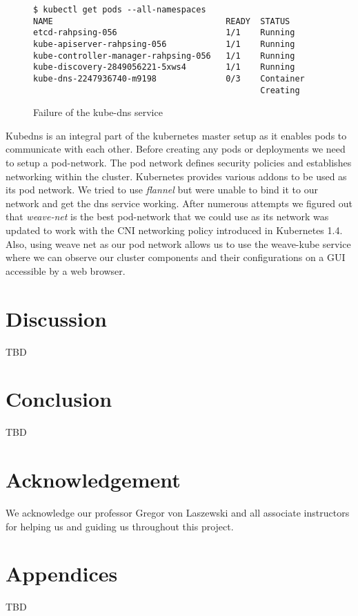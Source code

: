 \documentclass[9pt,twocolumn,twoside]{../../styles/osajnl}
\begin{document}
\begin{figure}[H]
\begin{verbatim}
$ kubectl get pods --all-namespaces
NAME                                   READY  STATUS       
etcd-rahpsing-056                      1/1    Running          
kube-apiserver-rahpsing-056            1/1    Running           
kube-controller-manager-rahpsing-056   1/1    Running           
kube-discovery-2849056221-5xws4        1/1    Running         
kube-dns-2247936740-m9198              0/3    Container
                                              Creating
\end{verbatim}
\vspace{-3mm}
\caption{Failure of the kube-dns service}
\vspace{-3mm}
\label{Instantiation failure of the kube-dns service}
\end{figure}
Kubedns is an integral part of the kubernetes master setup as it
enables pods to communicate with each other. Before creating any pods
or deployments we need to setup a pod-network. The pod network defines
security policies and establishes networking within the
cluster. Kubernetes provides various addons to be used as its pod
network. We tried to use \emph{flannel} but were unable to bind it to
our network and get the dns service working. After numerous attempts
we figured out that \emph{weave-net} is the best pod-network that we
could use as its network was updated to work with the CNI networking
policy introduced in Kubernetes 1.4. Also, using weave net as our pod
network allows us to use the weave-kube service where we can observe
our cluster components and their configurations on a GUI accessible by
a web browser.


\section{Discussion}
TBD

\section{Conclusion}

TBD

\section{Acknowledgement}

We acknowledge our professor Gregor von Laszewski and all associate
instructors for helping us and guiding us throughout this project.

\section{Appendices}
TBD


 
\end{document}
